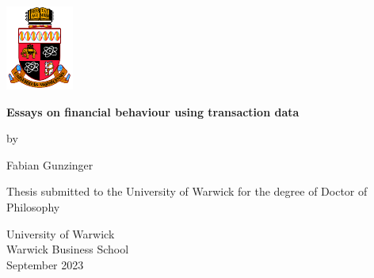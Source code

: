 \documentclass[a4paper, 12pt]{report}
\begin{document}

\begin{center}
\thispagestyle{empty}

\includegraphics[width=.3\textwidth]{warwickcrest.pdf}

{\bf\LARGE Essays on financial behaviour using transaction data}
\vspace{2cm}

by

Fabian Gunzinger


Thesis submitted to the University of Warwick for the degree of Doctor of
Philosophy

University of Warwick \\
Warwick Business School \\
September 2023






\end{center}

\restoregeometry

\end{document}

